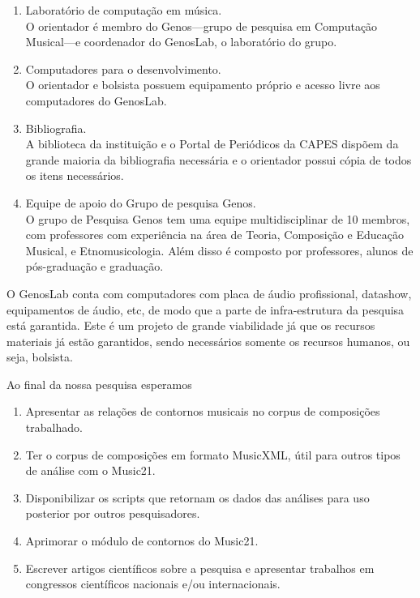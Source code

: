 \documentclass[11pt]{article}
\begin{document}
\begin{enumerate}
\item Laboratório de computação em música. \\
  O orientador é membro do Genos---grupo de pesquisa em Computação
  Musical---e coordenador do GenosLab, o laboratório do grupo.
\item Computadores para o desenvolvimento.\\
  O orientador e bolsista possuem equipamento próprio e acesso livre
  aos computadores do GenosLab.
\item Bibliografia.\\ A biblioteca da instituição e o Portal de
  Periódicos da CAPES dispõem da grande maioria da bibliografia
  necessária e o orientador possui cópia de todos os itens
  necessários.
\item Equipe de apoio do Grupo de pesquisa Genos.\\ O grupo de
  Pesquisa Genos tem uma equipe multidisciplinar de 10 membros, com
  professores com experiência na área de Teoria, Composição e Educação
  Musical, e Etnomusicologia. Além disso é composto por professores,
  alunos de pós-graduação e graduação.
\end{enumerate}

O GenosLab conta com computadores com placa de áudio profissional,
datashow, equipamentos de áudio, etc, de modo que a parte de
infra-estrutura da pesquisa está garantida. Este é um projeto de
grande viabilidade já que os recursos materiais já estão garantidos,
sendo necessários somente os recursos humanos, ou seja, bolsista.


Ao final da nossa pesquisa esperamos
\begin{enumerate}
\item Apresentar as relações de contornos musicais no corpus de
  composições trabalhado.
\item Ter o corpus de composições em formato MusicXML, útil para
  outros tipos de análise com o Music21.
\item Disponibilizar os scripts que retornam os dados das análises
  para uso posterior por outros pesquisadores.
\item Aprimorar o módulo de contornos do Music21.
\item Escrever artigos científicos sobre a pesquisa e apresentar
  trabalhos em congressos científicos nacionais e/ou internacionais.
\end{enumerate}
\end{document}
